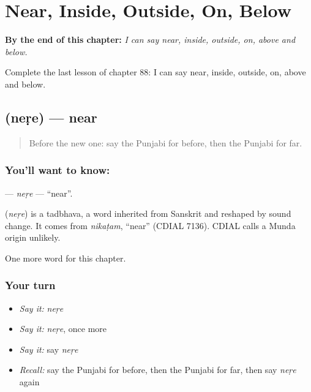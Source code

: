 
\chapter{Near, Inside, Outside, On, Below}
\label{ch:pa-near-inside-outside-on-below}

\begin{chapteropening}
\textbf{By the end of this chapter:} \emph{I can say near, inside, outside, on, above and below.}

Complete the last lesson of chapter 88: I can say near, inside, outside, on, above and below.
\end{chapteropening}

\section[\texorpdfstring{\pa{ਨੇੜੇ} (neṛe)}{ਨੇੜੇ (neṛe)}]{ (neṛe) — near}

\label{lesson:PA-C88-nere}



\begin{quote}
Before the new one: say the Punjabi for before, then the Punjabi for far.
\end{quote}

\subsection*{You'll want to know: }
\textbf{} — \emph{neṛe} — \textquotedblleft{}near\textquotedblright{}.

\begin{cousinweb}
\textbf{} (\emph{neṛe}) is a tadbhava, a word inherited from Sanskrit and reshaped by sound change. It comes from \emph{nikaṭam}, \textquotedblleft{}near\textquotedblright{} (CDIAL 7136). CDIAL calls a Munda origin unlikely.
\end{cousinweb}

\begin{grammarlens}[title={What you've built}]
One more word for this chapter.
\end{grammarlens}

\subsection*{Your turn}
\begin{itemize}
\raggedright
  \item \emph{Say it:} \emph{neṛe}
  \item \emph{Say it:} \emph{neṛe}, once more
  \item \emph{Say it:} say \emph{neṛe}
  \item \emph{Recall:} say the Punjabi for before, then the Punjabi for far, then say \emph{neṛe} again
\end{itemize}

